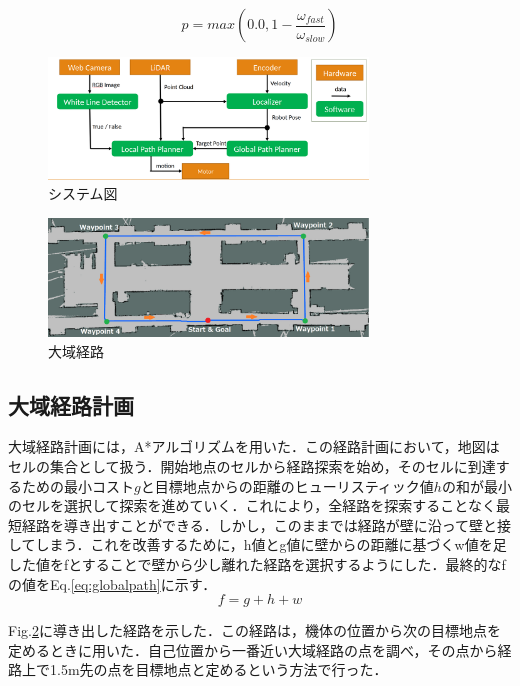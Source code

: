 \documentclass{jarticle}
\begin{document}
\begin{equation}
	p = max(0.0 , 1-\frac{\omega_{fast}}{\omega_{slow}})
	\label{eq:localization}
\end{equation}


\begin{figure}
	\includegraphics[width=8.5cm]{./picture/system.png}
	\caption{システム図}
	\label{fig:system}
\end{figure}

\begin{figure}
	\includegraphics[width=8.5cm]{./picture/global_path.png}
	\caption{大域経路}
	\label{fig:globalpath}
\end{figure}


\subsection{大域経路計画}
大域経路計画には，A*アルゴリズムを用いた．この経路計画において，地図はセルの集合として扱う．開始地点のセルから経路探索を始め，そのセルに到達するための最小コスト$g$と目標地点からの距離のヒューリスティック値$h$の和が最小のセルを選択して探索を進めていく．これにより，全経路を探索することなく最短経路を導き出すことができる．しかし，このままでは経路が壁に沿って壁と接してしまう．これを改善するために，h値とg値に壁からの距離に基づくw値を足した値をfとすることで壁から少し離れた経路を選択するようにした．最終的なfの値をEq.\ref{eq:globalpath}に示す．
\begin{equation}
	f = g + h + w
	\label{eq:globalpath}
\end{equation}

Fig.\ref{fig:globalpath}に導き出した経路を示した．この経路は，機体の位置から次の目標地点を定めるときに用いた．自己位置から一番近い大域経路の点を調べ，その点から経路上で1.5m先の点を目標地点と定めるという方法で行った．
\end{document}
